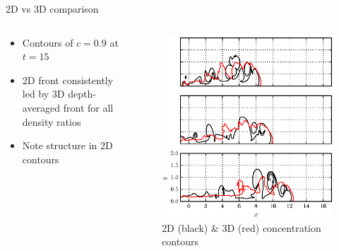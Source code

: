 \documentclass[presentation]{beamer}
\begin{document}
\begin{frame}[label={sec:orgab2c8d8}]{2D vs 3D comparison}
\begin{columns}
\begin{column}{0.5\columnwidth}
\begin{itemize}
\item Contours of \(c=0.9\) at \(t=15\)
\item 2D front consistently led by 3D depth-averaged front for all density ratios
\item Note structure in 2D contours
\end{itemize}
\end{column}

\begin{column}{0.5\columnwidth}
\begin{figure}[htbp]
\centering
\includegraphics[width=0.9\columnwidth]{./figures/c09-2d3d-t15.eps}
\caption{2D (black) \& 3D (red) concentration contours}
\end{figure}
\end{column}
\end{columns}
\end{frame}
\end{document}
